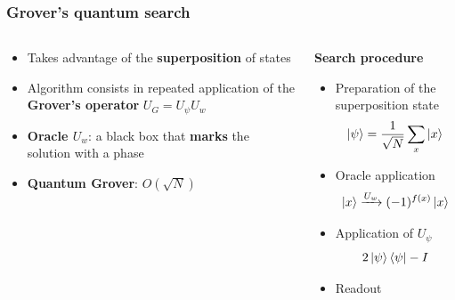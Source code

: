 \documentclass{beamer}
\newcommand{\bb}[1]{\textbf{\textcolor{darkish_blue}{#1}}}
\begin{document}
\begin{frame}
\frametitle{Grover's quantum search}

\begin{columns}
	\begin{column}[T]{0.5\textwidth}
		\begin{itemize}
			\item Takes advantage of the \bb{superposition} of states
			\item Algorithm consists in repeated application of the \bb{Grover's operator} $U_G = U_\psi U_w$
			\item \bb{Oracle $U_w$}: a black box that \bb{marks} the solution with a phase
			
		\end{itemize}

		\vspace{1.5cm}
		\begin{itemize}
			\item \bb{Quantum Grover}: $O(\sqrt{N})$
		\end{itemize}
	\end{column}

	\begin{column}[T]{0.4\textwidth}
	\vspace{-0.2cm}
	\begin{tcolorbox}[width=5.2cm, colframe=darkblue, colback=white, halign=center, left=1pt, right=1pt]
	\centering
	\bb{Search procedure}
		\begin{itemize}
			\item Preparation of the superposition state $$\ket{\psi}=\frac{1}{\sqrt{N}}\sum_{x}\ket{x}$$ 
			\item Oracle application $$\ket{x}\xrightarrow{U_w}(-1)^{f(x)}\ket{x}$$
			\item Application of $U_\psi$ $$2\ket{\psi}\bra{\psi}-I$$
			\item Readout
		\end{itemize}
	\end{tcolorbox}
	\end{column}

\end{columns}
\end{frame}

\end{document}
